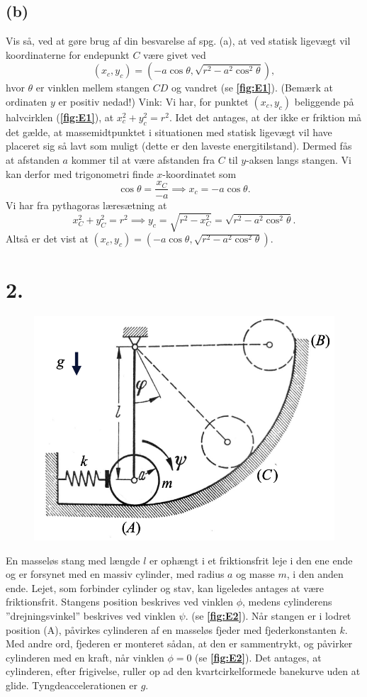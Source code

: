 \documentclass[12pt]{article}
\theoremstyle{definition}
\begin{document}
\subsection*{(b)}
Vis så, ved at gøre brug af din besvarelse af spg. (a), at ved statisk ligevægt vil koordinaterne for endepunkt $C$ være givet ved
\[ 
  (x_c, y_c) = \left( -a \cos\theta, \sqrt{r^2 - a^2 \cos^2 \theta} \right)
,\]
hvor $\theta$ er vinklen mellem stangen $CD$ og vandret (se \textbf{\autoref{fig:E1}}). (Bemærk at ordinaten $y$ er positiv nedad!)
Vink: Vi har, for punktet $(x_c, y_c)$ beliggende på halvcirklen (\textbf{\autoref{fig:E1}}), at $x_c^2 + y_c^2 = r^2$.
\bigbreak
Idet det antages, at der ikke er friktion må det gælde, at massemidtpunktet i situationen med statisk ligevægt vil have placeret sig så lavt som muligt (dette er den laveste energitilstand). Dermed fås at afstanden $a$ kommer til at være afstanden fra $C$ til $y$-aksen langs stangen. Vi kan derfor med trigonometri finde $x$-koordinatet som
\[
  \cos \theta = \frac{x_C}{-a} \implies x_c = -a \cos\theta
.\]
Vi har fra pythagoras læresætning at
\[ 
x_C^2 + y_C^2 = r^2 \implies y_c = \sqrt{r^2 - x_C^2} = \sqrt{r^2 - a^2 \cos^2 \theta}
.\]
Altså er det vist at \underline{\underline{$(x_c, y_c) = (-a \cos\theta, \sqrt{r^2 - a^2 \cos^2 \theta})$}}.


\section*{2.}
\begin{figure} [ht]
  \centering
  \caption{}
  \includegraphics[width=0.5\linewidth]{../figures/E2.png}
  \label{fig:E2}
\end{figure}

En masseløs stang med længde $l$ er ophængt i et friktionsfrit leje i den ene ende og er forsynet med en massiv cylinder, med radius $a$ og masse $m$, i den anden ende. Lejet, som forbinder cylinder og stav, kan ligeledes antages at være friktionsfrit. Stangens position beskrives ved vinklen $\phi$, medens cylinderens ”drejningsvinkel” beskrives ved vinklen $\psi$. (se \textbf{\autoref{fig:E2}}). Når stangen er i lodret position (A), påvirkes cylinderen af en masseløs fjeder med fjederkonstanten $k$. Med andre ord, fjederen er monteret sådan, at den er sammentrykt, og påvirker cylinderen med en kraft, når vinklen $\phi = 0$ (se \textbf{\autoref{fig:E2}}). Det antages, at cylinderen, efter frigivelse, ruller op ad den kvartcirkelformede banekurve uden at glide. Tyngdeaccelerationen er $g$. 
\end{document}
